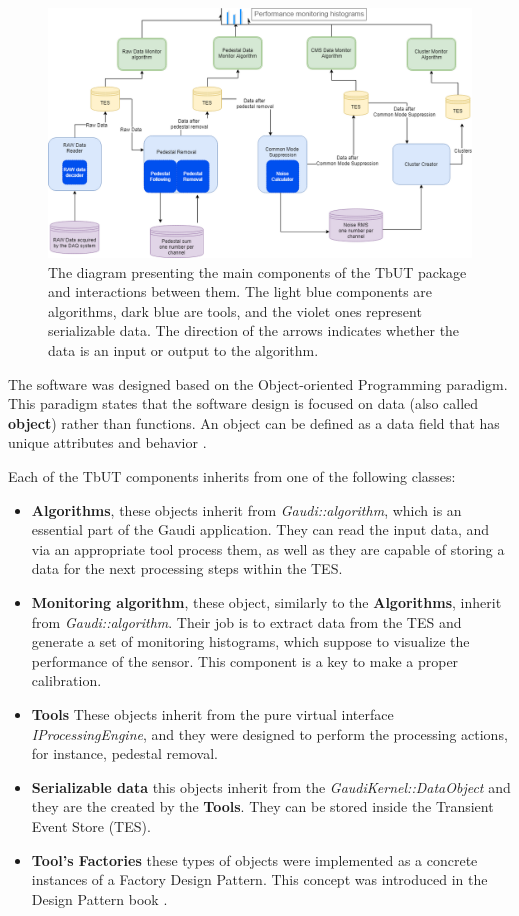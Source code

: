 \begin{figure}[h]
\centering
\includegraphics{figures/TBUT.png}
\caption{The diagram presenting the main components of the TbUT package and interactions between them. The light blue components are algorithms, dark blue are tools, and the violet ones represent serializable data. The direction of the arrows indicates whether the data is an input or output to the algorithm. }
\label{fig:TbUT}
\end{figure}


The software was designed based on the Object-oriented Programming paradigm.   This paradigm states that the software design is focused on data (also called \textbf{object}) rather than functions. An object can be defined as a data field that has unique attributes and behavior \cite{programming_paradigma}. 

Each of the TbUT components inherits from one of the following classes:  

\begin{itemize}
    \item \textbf{Algorithms}, these objects inherit from \textit{Gaudi::algorithm}, which is an essential part of the Gaudi application. They can read the input data, and via an appropriate tool process them, as well as they are capable of storing a data for the next processing steps within the TES. 
    \item \textbf{Monitoring algorithm}, these object, similarly to the \textbf{Algorithms}, inherit from  \textit{Gaudi::algorithm}. Their job is to extract data from the TES and generate a set of monitoring histograms, which suppose to visualize the performance of the sensor. This component is a key to make a proper calibration. 
    \item \textbf{Tools} These objects inherit from the pure virtual interface \textit{IProcessingEngine}, and they were designed to perform the processing actions, for instance, pedestal removal. 
    \item \textbf{Serializable data} this objects inherit from the \textit{GaudiKernel::DataObject} and they are the created by the \textbf{Tools}. They can be stored inside the Transient Event Store (TES). 
    \item \textbf{ Tool's Factories} these types of objects were implemented as a concrete instances of a Factory Design Pattern. This concept was introduced in the Design Pattern book \cite{DesignPatterns}. 
\end{itemize}

